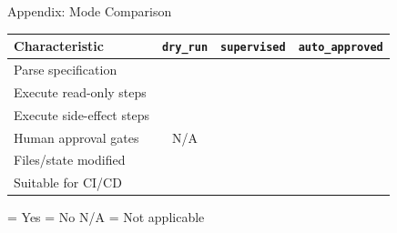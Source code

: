 \documentclass[aspectratio=169]{beamer}
\newcommand{\faCheck}{\ding{51}}
\newcommand{\faTimes}{\ding{55}}
\begin{document}
\begin{frame}{Appendix: Mode Comparison}
\begin{center}
\begin{tabular}{l|ccc}
\toprule
\textbf{Characteristic} & \texttt{dry\_run} & \texttt{supervised} & \texttt{auto\_approved} \\
\midrule
Parse specification & \textcolor{dryrungreen}{\faCheck} & \textcolor{dryrungreen}{\faCheck} & \textcolor{dryrungreen}{\faCheck} \\
Execute read-only steps & \textcolor{sideeffectred}{\faTimes} & \textcolor{dryrungreen}{\faCheck} & \textcolor{dryrungreen}{\faCheck} \\
Execute side-effect steps & \textcolor{sideeffectred}{\faTimes} & \textcolor{dryrungreen}{\faCheck} & \textcolor{dryrungreen}{\faCheck} \\
Human approval gates & N/A & \textcolor{dryrungreen}{\faCheck} & \textcolor{sideeffectred}{\faTimes} \\
Files/state modified & \textcolor{sideeffectred}{\faTimes} & \textcolor{dryrungreen}{\faCheck} & \textcolor{dryrungreen}{\faCheck} \\
Suitable for CI/CD & \textcolor{sideeffectred}{\faTimes} & \textcolor{sideeffectred}{\faTimes} & \textcolor{dryrungreen}{\faCheck} \\
\bottomrule
\end{tabular}
\end{center}

\vspace{1em}

\begin{center}
\footnotesize
\textcolor{dryrungreen}{\faCheck} = Yes \quad 
\textcolor{sideeffectred}{\faTimes} = No \quad
N/A = Not applicable
\end{center}
\end{frame}
\end{document}
